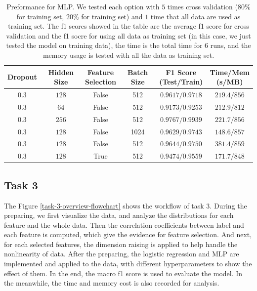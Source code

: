 \documentclass[11pt]{article}
\begin{document}
\begin{table}[H]
  \centering
  \begin{tabular}{|c|c|c|c|c|c|}
    \hline
    Dropout & Hidden Size & \makecell{Feature                                        \\ Selection} &Batch Size & \makecell{F1 Score \\ (Test/Train)} & \makecell{Time/Mem \\ (s/MB)} \\
    \hline
    $0.3$   & $128$       & False             & 512  & $0.9617/0.9718$ & $219.4/856$ \\
    \hline
    $0.3$   & $64$        & False             & 512  & $0.9173/0.9253$ & $212.9/812$ \\
    \hline
    $0.3$   & $256$       & False             & 512  & $0.9767/0.9939$ & $221.7/856$ \\
    \hline
    $0.3$   & $128$       & False             & 1024 & $0.9629/0.9743$ & $148.6/857$ \\
    \hline
    $0.3$   & $128$       & False             & 512  & $0.9644/0.9750$ & $381.4/859$ \\
    \hline
    $0.3$   & $128$       & True              & 512  & $0.9474/0.9559$ & $171.7/848$ \\
    \hline
  \end{tabular}
  \caption{Preformance for MLP. We tested each option with $5$ times cross validation ($80\%$ for training set, $20\%$ for training set) and $1$ time that all data are used as training set. The f1 scores showed in the table are the average f1 score for cross validation and the f1 socre for using all data as training set (in this case, we just tested the model on training data), the time is the total time for $6$ runs, and the memory usage is tested with all the data as training set.}
  \label{task-2-result-2}
\end{table}

\subsection{Task 3}

The Figure \ref{task-3-overview-flowchart} shows the workflow of task 3. During the preparing, we first visualize the data, and analyze the distributions for each feature and the whole data. Then the correlation coefficients between label and each feature is computed, which give the evidence for feature selection. And next, for each selected features, the dimension raising is applied to help handle the nonlinearity of data. After the preparing, the logistic regression and MLP are implemented and applied to the data, with different hyperparameters to show the effect of them. In the end, the macro f1 score is used to evaluate the model. In the meanwhile, the time and memory cost is also recorded for analysis.
\end{document}
